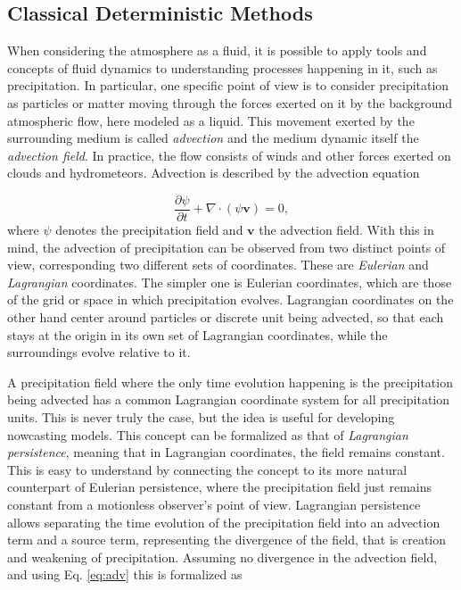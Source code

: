 \subsection{Classical Deterministic Methods}
\label{section:classic_nowcast}


When considering the atmosphere as a fluid, it is possible to apply tools and concepts of fluid dynamics to understanding processes happening in it, such as precipitation. In particular, one specific point of view is to consider precipitation as particles or matter moving through the forces exerted on it by the background atmospheric flow, here modeled as a liquid. This movement exerted by the surrounding medium is called \textit{advection} and the medium dynamic itself the \textit{advection field}. In practice, the flow consists of winds and other forces exerted on clouds and hydrometeors. Advection is described by the advection equation

\begin{equation}
	\label{eq:adv}
	\frac{\partial \psi}{\partial t} + \nabla \cdot (\psi \pmb{v}) = 0,
\end{equation}
%
where $\psi$ denotes the precipitation field and $\pmb{v}$ the advection field. With this in mind, the advection of precipitation can be observed from two distinct points of view, corresponding two different sets of coordinates. These are \textit{Eulerian} and \textit{Lagrangian} coordinates. The simpler one is Eulerian coordinates, which are those of the grid or space in which precipitation evolves. Lagrangian coordinates on the other hand center around particles or discrete unit being advected, so that each stays at the origin in its own set of Lagrangian coordinates, while the surroundings evolve relative to it. 

A precipitation field where the only time evolution happening is the precipitation being advected has a common Lagrangian coordinate system for all precipitation units. This is never truly the case, but the idea is useful for developing nowcasting models. This concept can be formalized as that of \textit{Lagrangian persistence}, meaning that in Lagrangian coordinates, the field remains constant. This is easy to understand by connecting the concept to its more natural counterpart of Eulerian persistence, where the precipitation field just remains constant from a motionless observer's point of view. Lagrangian persistence allows separating the time evolution of the precipitation field into an advection term and a source term, representing the divergence of the field, that is creation and weakening of precipitation. Assuming no divergence in the advection field, and using Eq. \eqref{eq:adv} this is formalized as 

